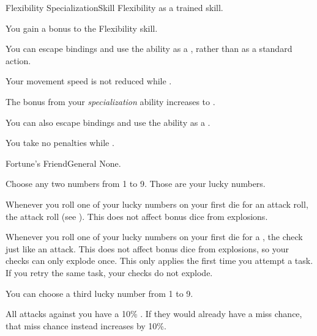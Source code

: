 


  \begin{feat}{Flexibility Specialization}{Skill}
    \featpre Flexibility as a trained skill.

     You gain a  bonus to the Flexibility skill.

     You can escape bindings and use the  ability as a , rather than as a standard action.

     Your movement speed is not reduced while \squeezing.

     The bonus from your \textit{specialization} ability increases to .

     You can also escape bindings and use the  ability as a .

     You take no penalties while \squeezing.
  \end{feat}

  \begin{feat}{Fortune's Friend}{General}
    \featpre None.

     Choose any two numbers from 1 to 9.
    Those are your lucky numbers.

     Whenever you roll one of your lucky numbers on your first die for an attack roll, the attack roll  (see ).
    This does not affect bonus dice from explosions.

     Whenever you roll one of your lucky numbers on your first die for a , the check  just like an attack.
    This does not affect bonus dice from explosions, so your checks can only explode once.
    This only applies the first time you attempt a task.
    If you retry the same task, your checks do not explode.

     You can choose a third lucky number from 1 to 9.

     All  attacks against you have a 10\% .
    If they would already have a miss chance, that miss chance instead increases by 10\%.
  \end{feat}

